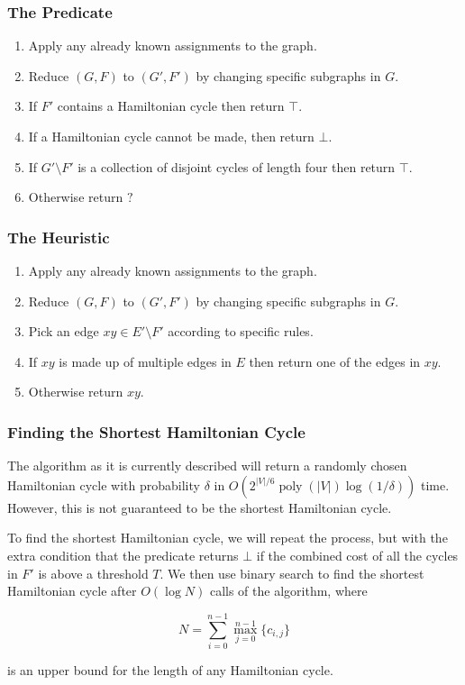 \documentclass[]{beamer}
\DeclareMathOperator{\poly}{poly}
\begin{document}
\begin{frame}
\frametitle{The Predicate}

\begin{enumerate}
\item Apply any already known assignments to the graph.
\item Reduce $(G, F)$ to $(G', F')$ by changing specific subgraphs in $G$.
\item If $F'$ contains a Hamiltonian cycle then return $\top$.
\item If a Hamiltonian cycle cannot be made, then return $\bot$.
\item If $G' \setminus F'$ is a collection of disjoint cycles of length four then return $\top$.
\item Otherwise return $?$
\end{enumerate}
\end{frame}

\begin{frame}
\frametitle{The Heuristic}

\begin{enumerate}
\item Apply any already known assignments to the graph.
\item Reduce $(G, F)$ to $(G', F')$ by changing specific subgraphs in $G$.
\item Pick an edge $xy \in E' \setminus F'$ according to specific rules.
\item If $xy$ is made up of multiple edges in $E$ then return one of the edges in $xy$.
\item Otherwise return $xy$.
\end{enumerate}
\end{frame}

\begin{frame}
\frametitle{Finding the Shortest Hamiltonian Cycle}

The algorithm as it is currently described will return a randomly chosen Hamiltonian cycle with probability $\delta$ in $O(2^{|V|/6}\poly(|V|)\log(1/\delta))$ time. However, this is not guaranteed to be the shortest Hamiltonian cycle.

To find the shortest Hamiltonian cycle, we will repeat the process, but with the extra condition that the predicate returns $\bot$ if the combined cost of all the cycles in $F'$ is above a threshold $T$. We then use binary search to find the shortest Hamiltonian cycle after $O(\log N)$ calls of the algorithm, where

$$N = \sum_{i = 0}^{n-1}\max_{j = 0}^{n-1}\{c_{i,j}\}$$

is an upper bound for the length of any Hamiltonian cycle.
\end{frame}
\end{document}
